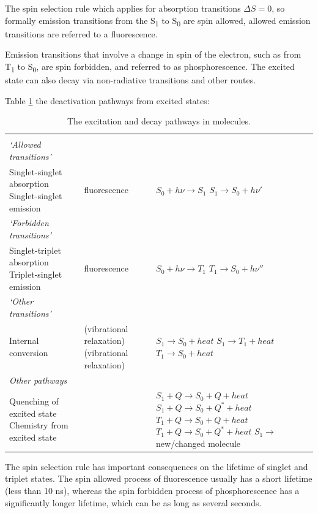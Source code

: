 \documentclass[
]{book}
\begin{document}
The spin selection rule which applies for absorption transitions \(\Delta S = 0\), so formally emission transitions from the S\textsubscript{1} to S\textsubscript{0} are spin allowed, allowed emission transitions are referred to a fluorescence.

Emission transitions that involve a change in spin of the electron, such as from T\textsubscript{1} to S\textsubscript{0}, are spin forbidden, and referred to as phosphorescence. The excited state can also decay via non-radiative transitions and other routes.

Table \ref{tab:phototrans} the deactivation pathways from excited states:

\begin{longtable}[]{@{}
  >{\raggedright\arraybackslash}p{}
  >{\raggedright\arraybackslash}p{}
  >{\raggedright\arraybackslash}p{}@{}}
\caption{\label{tab:phototrans} The excitation and decay pathways in molecules.}\tabularnewline
\toprule
& & \\
\midrule
\endfirsthead
\toprule
& & \\
\midrule
\endhead
\emph{`Allowed transitions'} & & \\
Singlet-singlet absorption Singlet-singlet emission & fluorescence & \(S_0 + h \nu \longrightarrow S_1\) \(S_1 \longrightarrow S_0 + h \nu '\) \\
\emph{`Forbidden transitions'} & & \\
Singlet-triplet absorption Triplet-singlet emission & fluorescence & \(S_0 + h \nu \longrightarrow T_1\) \(T_1 \longrightarrow S_0 + h \nu ''\) \\
\emph{`Other transitions'} & & \\
Internal conversion & (vibrational relaxation) (vibrational relaxation) & \(S_1 \longrightarrow S_0 + heat\) \(S_1 \longrightarrow T_1 + heat\) \(T_1 \longrightarrow S_0 + heat\) \\
\emph{Other pathways} & & \\
Quenching of excited state Chemistry from excited state & & \(S_1 + Q \longrightarrow S_0 + Q +heat\) \(S_1 + Q \longrightarrow S_0 + Q^\ast +heat\) \(T_1 + Q \longrightarrow S_0 + Q +heat\) \(T_1 + Q \longrightarrow S_0 + Q^\ast +heat\) \(S_1 \longrightarrow\) new/changed molecule \\
\bottomrule
\end{longtable}

The spin selection rule has important consequences on the lifetime of singlet and triplet states. The spin allowed process of fluorescence usually has a short lifetime (less than 10 ns), whereas the spin forbidden process of phosphorescence has a significantly longer lifetime, which can be as long as several seconds.
\end{document}
